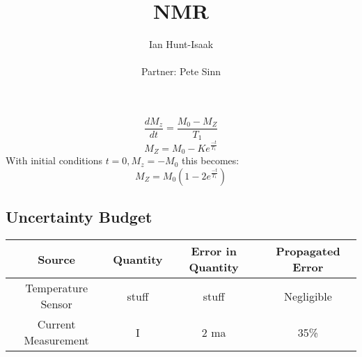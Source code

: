 \documentclass[11pt,letterpaper]{article}
\title{NMR}
\author{Ian Hunt-Isaak\\ \begin{small}
Partner: Pete Sinn
\end{small}}
\begin{document}
\date{}
\maketitle
\section{}

\section{}

\section{}
\begin{equation}
\frac{dM_z}{dt}=\frac{M_0 - M_Z}{T_1}
\end{equation}
\begin{equation}
M_Z = M_0-Ke^{\frac{-t}{T_1}}
\end{equation}
With initial conditions $t=0, M_z=-M_0$ this becomes:
\begin{equation}
M_Z = M_0(1-2e^{\frac{-t}{T_1}})
\end{equation}

\subsection{Uncertainty Budget}
\begin{table}[h]
\begin{center}
\begin{tabular}{|c|c|c|c|} \hline 
Source & Quantity&  Error in Quantity  & Propagated Error  \\ \hline
\hline Temperature Sensor & stuff & stuff & Negligible\\
\hline Current Measurement & I & 2 ma & 35\%\\
\hline \hline
\end{tabular}
\end{center}
\end{table}



\section{}
\section{}
\end{document}
